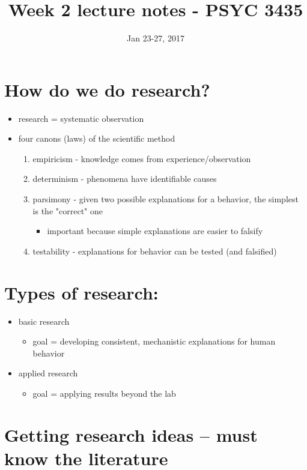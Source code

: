 \documentclass[11pt]{article}
\date{Jan 23-27, 2017}
\title{Week 2 lecture notes - PSYC 3435}
\begin{document}
\maketitle

\section*{How do we do research?}
\label{sec-1}
\begin{itemize}
\item research = systematic observation
\item four canons (laws) of the scientific method
\begin{enumerate}
\item empiricism - knowledge comes from experience/observation
\item determinism - phenomena have identifiable causes
\item parsimony - given two possible explanations for a behavior, the simplest is the "correct" one
\begin{itemize}
\item important because simple explanations are easier to falsify
\end{itemize}
\item testability - explanations for behavior can be tested (and falsified)
\end{enumerate}
\end{itemize}

\section*{Types of research:}
\label{sec-2}
\begin{itemize}
\item basic research
\begin{itemize}
\item goal = developing consistent, mechanistic explanations for human behavior
\end{itemize}
\item applied research
\begin{itemize}
\item goal = applying results beyond the lab
\end{itemize}
\end{itemize}

\section*{Getting research ideas -- must know the \textbf{literature}}
\label{sec-3}
\end{document}
